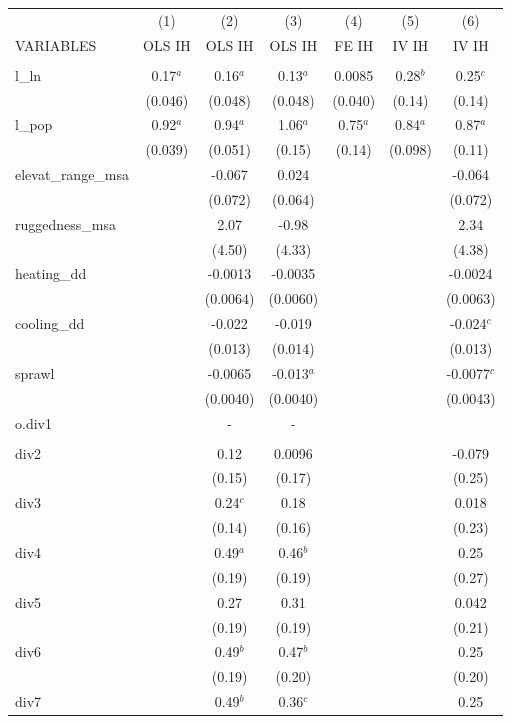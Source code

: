 \documentclass[]{article}
\begin{document}
\begin{tabular}{lcccccc} \hline
 & (1) & (2) & (3) & (4) & (5) & (6) \\
VARIABLES & OLS IH & OLS IH & OLS IH & FE IH & IV IH & IV IH \\ \hline
 &  &  &  &  &  &  \\
l\_ln & 0.17$^a$ & 0.16$^a$ & 0.13$^a$ & 0.0085 & 0.28$^b$ & 0.25$^c$ \\
 & (0.046) & (0.048) & (0.048) & (0.040) & (0.14) & (0.14) \\
l\_pop & 0.92$^a$ & 0.94$^a$ & 1.06$^a$ & 0.75$^a$ & 0.84$^a$ & 0.87$^a$ \\
 & (0.039) & (0.051) & (0.15) & (0.14) & (0.098) & (0.11) \\
elevat\_range\_msa &  & -0.067 & 0.024 &  &  & -0.064 \\
 &  & (0.072) & (0.064) &  &  & (0.072) \\
ruggedness\_msa &  & 2.07 & -0.98 &  &  & 2.34 \\
 &  & (4.50) & (4.33) &  &  & (4.38) \\
heating\_dd &  & -0.0013 & -0.0035 &  &  & -0.0024 \\
 &  & (0.0064) & (0.0060) &  &  & (0.0063) \\
cooling\_dd &  & -0.022 & -0.019 &  &  & -0.024$^c$ \\
 &  & (0.013) & (0.014) &  &  & (0.013) \\
sprawl &  & -0.0065 & -0.013$^a$ &  &  & -0.0077$^c$ \\
 &  & (0.0040) & (0.0040) &  &  & (0.0043) \\
o.div1 &  & - & - &  &  &  \\
 &  &  &  &  &  &  \\
div2 &  & 0.12 & 0.0096 &  &  & -0.079 \\
 &  & (0.15) & (0.17) &  &  & (0.25) \\
div3 &  & 0.24$^c$ & 0.18 &  &  & 0.018 \\
 &  & (0.14) & (0.16) &  &  & (0.23) \\
div4 &  & 0.49$^a$ & 0.46$^b$ &  &  & 0.25 \\
 &  & (0.19) & (0.19) &  &  & (0.27) \\
div5 &  & 0.27 & 0.31 &  &  & 0.042 \\
 &  & (0.19) & (0.19) &  &  & (0.21) \\
div6 &  & 0.49$^b$ & 0.47$^b$ &  &  & 0.25 \\
 &  & (0.19) & (0.20) &  &  & (0.20) \\
div7 &  & 0.49$^b$ & 0.36$^c$ &  &  & 0.25 \\

\end{tabular}
\end{document}
